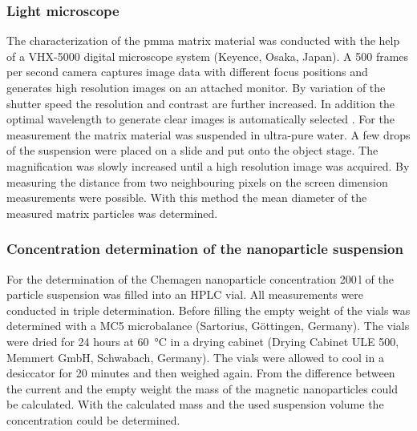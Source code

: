 \subsubsection{Light microscope}
\label{subsubsec:light_mic}
The characterization of the \gls{pmma} matrix material was conducted with the help of a VHX-5000 digital microscope system (Keyence, Osaka, Japan). A 500 frames per second camera captures image data with different focus positions and generates high resolution images on an attached monitor. By variation of the shutter speed the resolution and contrast are further increased. In addition the optimal wavelength to generate clear images is automatically selected \cite{VHX5000}. For the measurement the matrix material was suspended in ultra-pure water. A few drops of the suspension were placed on a slide and put onto the object stage. The magnification was slowly increased until a high resolution image was acquired. By measuring the distance from two neighbouring pixels on the screen dimension measurements were possible. With this method the mean diameter of the measured matrix particles was determined.    


\subsubsection{Concentration determination of the nanoparticle suspension}
\label{subsubsec:Conc_MF}
For the determination of the Chemagen nanoparticle concentration 200\,\textmu l of the particle suspension was filled into an HPLC vial. All measurements were conducted in triple determination. Before filling the empty weight of the vials was determined with a MC5 microbalance (Sartorius, Göttingen, Germany). The vials were dried for 24 hours at \SI{60}{\celsius} in a drying cabinet (Drying Cabinet ULE 500, Memmert GmbH, Schwabach, Germany). The vials were allowed to cool in a desiccator for 20 minutes and then weighed again. From the difference between the current and the empty weight the mass of the magnetic nanoparticles could be calculated. With the calculated mass and the used suspension volume the concentration could be determined.  


